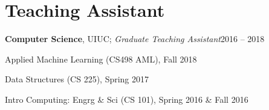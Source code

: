 \section{Teaching Assistant}
\textbf{Computer Science}, UIUC; \textit{Graduate Teaching Assistant}{\hfill{\color{muted}2016 -- 2018}}\par
\begin{list2}
\item Applied Machine Learning (CS498 AML), Fall 2018
\item Data Structures (CS 225), Spring 2017
\item Intro Computing: Engrg \& Sci (CS 101), Spring 2016 \& Fall 2016
\end{list2}




